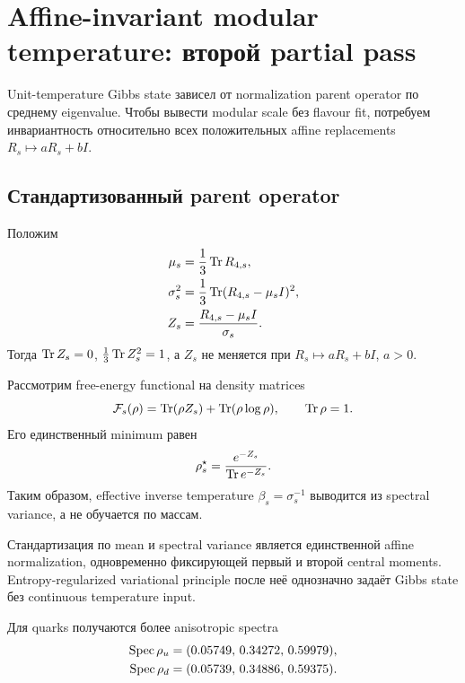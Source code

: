 \chapter{Affine-invariant modular temperature: второй partial pass}

Unit-temperature Gibbs state зависел от normalization parent operator по
среднему eigenvalue. Чтобы вывести modular scale без flavour fit, потребуем
инвариантность относительно всех положительных affine replacements
\(R_s\mapsto aR_s+bI\).

\section{Стандартизованный parent operator}

Положим
\begin{align}
 \mu_s&=\frac13\operatorname{Tr} R_{4,s},\\
 \sigma_s^2&=\frac13\operatorname{Tr}(R_{4,s}-\mu_sI)^2,\\
 Z_s&=\frac{R_{4,s}-\mu_sI}{\sigma_s}.
\end{align}
Тогда \(\operatorname{Tr} Z_s=0\), \(\frac13\operatorname{Tr} Z_s^2=1\), а \(Z_s\) не меняется при
\(R_s\mapsto aR_s+bI\), \(a>0\).

Рассмотрим free-energy functional на density matrices
\begin{equation}
 \mathcal F_s(\rho)=\operatorname{Tr}(\rho Z_s)+\operatorname{Tr}(\rho\log\rho),
 \qquad \operatorname{Tr}\rho=1.
\end{equation}
Его единственный minimum равен
\begin{equation}
 \rho_s^\star=\frac{e^{-Z_s}}{\operatorname{Tr} e^{-Z_s}}.
\end{equation}
Таким образом, effective inverse temperature \(\beta_s=\sigma_s^{-1}\)
выводится из spectral variance, а не обучается по массам.

\begin{theorem}
Стандартизация по mean и spectral variance является единственной affine
normalization, одновременно фиксирующей первый и второй central moments.
Entropy-regularized variational principle после неё однозначно задаёт Gibbs
state без continuous temperature input.
\end{theorem}

Для quarks получаются более anisotropic spectra
\begin{align}
 \operatorname{Spec}\rho_u&=(0.05749,\,0.34272,\,0.59979),\\
 \operatorname{Spec}\rho_d&=(0.05739,\,0.34886,\,0.59375).
\end{align}

